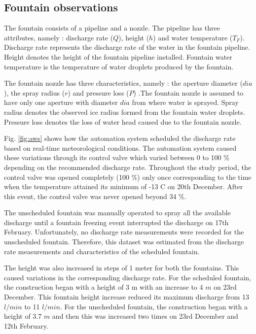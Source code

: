 \documentclass[tc, manuscript]{copernicus}
\begin{document}
\subsection{Fountain observations}

The fountain consists of a pipeline and a nozzle. The pipeline has three attributes, namely : discharge rate
($Q$), height ($h$) and water temperature ($T_F$). Discharge rate represents the discharge rate of the water in
the fountain pipeline. Height denotes the height of the fountain pipeline installed. Fountain water temperature
is the temperature of water droplets produced by the fountain.

The fountain nozzle has three characteristics, namely : the aperture diameter ($dia$), the spray radius ($r$)
and pressure loss ($P$) .The fountain nozzle is assumed to have only one aperture with diameter $dia$ from where
water is sprayed. Spray radius denotes the observed ice radius formed from the fountain water droplets.
Pressure loss denotes the loss of water head caused due to the fountain nozzle.

Fig. \ref{fig:aws} shows how the automation system scheduled the discharge rate based on real-time
meteorological conditions. The automation system caused these variations through its control valve which varied
between 0 to 100 \% depending on the recommended discharge rate. Throughout the study period, the control valve
was opened completely (100 \%) only once corresponding to the time when the temperature attained its minimum of
-13 \degree C on 20th December. After this event, the control valve was never opened beyond 34 \%.  

The unscheduled fountain was manually operated to spray all the available discharge until a fountain freezing
event interrupted the discharge on 17th February. Unfortunately, no discharge rate measurements were recorded
for the unscheduled fountain. Therefore, this dataset was estimated from the discharge rate measurements and
characteristics of the scheduled fountain.

The height was also increased in steps of 1 meter for both the fountains. This caused variations in the
corresponding discharge rate. For the scheduled fountain, the construction began with a height of 3 m with an
increase to 4 $m$ on 23rd December. This fountain height increase reduced its maximum discharge from
13 $l/min$ to 11 $l/min$. For the unscheduled fountain, the construction began with a height of 3.7 $m$ and then
this was increased two times on 23rd December and 12th February.  
\end{document}
